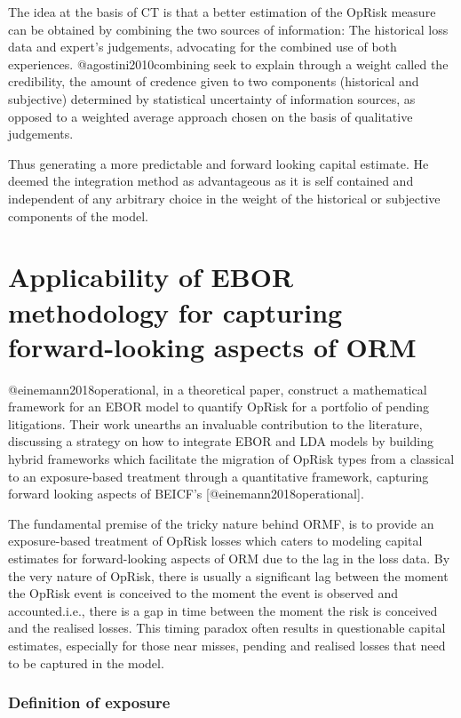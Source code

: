 \documentclass[]{article}
\begin{document}
The idea at the basis of CT is that a better estimation of the OpRisk
measure can be obtained by combining the two sources of information: The
historical loss data and expert's judgements, advocating for the
combined use of both experiences. @agostini2010combining seek to explain
through a weight called the credibility, the amount of credence given to
two components (historical and subjective) determined by statistical
uncertainty of information sources, as opposed to a weighted average
approach chosen on the basis of qualitative judgements.\medskip

Thus generating a more predictable and forward looking capital estimate.
He deemed the integration method as advantageous as it is self contained
and independent of any arbitrary choice in the weight of the historical
or subjective components of the model.

\section{Applicability of EBOR methodology for capturing forward-looking aspects of ORM}
\label{sec:Applicability of EBOR methodology for capturing forward-looking aspects of ORM}

@einemann2018operational, in a theoretical paper, construct a
mathematical framework for an EBOR model to quantify OpRisk for a
portfolio of pending litigations. Their work unearths an invaluable
contribution to the literature, discussing a strategy on how to
integrate EBOR and LDA models by building hybrid frameworks which
facilitate the migration of OpRisk types from a classical to an
exposure-based treatment through a quantitative framework, capturing
forward looking aspects of BEICF's {[}@einemann2018operational{]}.

The fundamental premise of the tricky nature behind ORMF, is to provide
an exposure-based treatment of OpRisk losses which caters to modeling
capital estimates for forward-looking aspects of ORM due to the lag in
the loss data. By the very nature of OpRisk, there is usually a
significant lag between the moment the OpRisk event is conceived to the
moment the event is observed and accounted.i.e., there is a gap in time
between the moment the risk is conceived and the realised losses. This
timing paradox often results in questionable capital estimates,
especially for those near misses, pending and realised losses that need
to be captured in the model.\medskip

\subsubsection{Definition of exposure}
\end{document}
